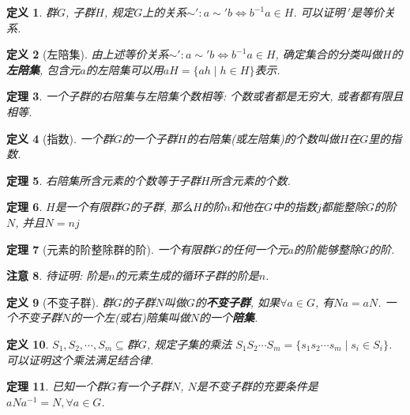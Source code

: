 \documentclass[UTF8]{ctexart}
\newtheorem{Definition}{定义}%
\newtheorem{Theorem}[Definition]{定理}
\newtheorem{Remark}[Definition]{注意}
\begin{document}
\begin{Definition}
群$G$, 子群$H$, 规定$G$上的关系$\sim': a \sim 'b \Leftrightarrow b^{-1} a \in H$. 可以证明$~'$是等价关系.
\end{Definition}

\begin{Definition}[左陪集]
由上述等价关系$\sim': a \sim' b \Leftrightarrow b^{-1} a \in H$, 确定集合的分类叫做$H$的\textbf{左陪集}, 包含元$a$的左陪集可以用$aH = \{ ah \mid h \in H \}$表示.
\end{Definition}

\begin{Theorem}
一个子群的右陪集与左陪集个数相等: 个数或者都是无穷大, 或者都有限且相等.
\end{Theorem}

\begin{Definition}[指数]
一个群$G$的一个子群$H$的右陪集(或左陪集)的个数叫做$H$在$G$里的指数.
\end{Definition}


\begin{Theorem}
右陪集所含元素的个数等于子群$H$所含元素的个数.
\end{Theorem}

\begin{Theorem}
$H$是一个有限群$G$的子群, 那么$H$的阶$n$和他在$G$中的指数$j$都能整除$G$的阶$N$, 并且$N = nj$
\end{Theorem}

\begin{Theorem}[元素的阶整除群的阶]
一个有限群$G$的任何一个元$a$的阶能够整除$G$的阶.
\end{Theorem}

\begin{Remark}
待证明: 阶是$n$的元素生成的循环子群的阶是$n$.
\end{Remark}

\begin{Definition}[不变子群]
群$G$的子群$N$叫做$G$的\textbf{不变子群}, 如果$\forall a \in G$, 有$Na = aN$. 一个不变子群$N$的一个左(或右)陪集叫做$N$的一个\textbf{陪集}.
\end{Definition}

\begin{Definition}
$S_1, S_2, \cdots, S_m \subseteq $群$G$, 规定子集的乘法
$S_1 S_2 \cdots S_m = \{s_1 s_2 \cdots s_m \mid s_i \in S_i \}$. 可以证明这个乘法满足结合律.
\end{Definition}

\begin{Theorem}
已知一个群$G$有一个子群$N$, $N$是不变子群的充要条件是$aNa^{-1} = N, \forall a \in G$.
\end{Theorem}
\end{document}
